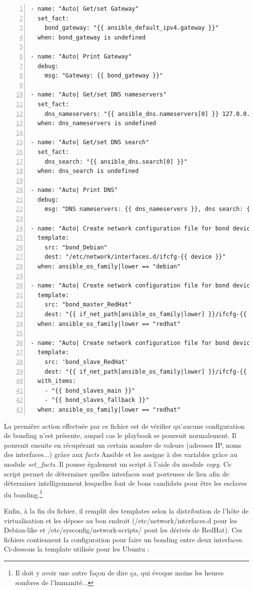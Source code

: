 \documentclass[14 pt,a4paper]{extreport}
\begin{document}
\begin{framed}
\begin{Verbatim}[fontsize=\tiny,numbers=left]
- name: "Auto| Get/set Gateway"
  set_fact:
    bond_gateway: "{{ ansible_default_ipv4.gateway }}"
  when: bond_gateway is undefined

- name: "Auto| Print Gateway"
  debug:
    msg: "Gateway: {{ bond_gateway }}"

- name: "Auto| Get/set DNS nameservers"
  set_fact:
    dns_nameservers: "{{ ansible_dns.nameservers[0] }} 127.0.0.1"
  when: dns_nameservers is undefined

- name: "Auto| Get/set DNS search"
  set_fact:
    dns_search: "{{ ansible_dns.search[0] }}"
  when: dns_search is undefined

- name: "Auto| Print DNS"
  debug:
    msg: "DNS nameservers: {{ dns_nameservers }}, dns search: {{ dns_search }}"

- name: "Auto| Create network configuration file for bond devices"
  template:
    src: "bond_Debian"
    dest: "/etc/network/interfaces.d/ifcfg-{{ device }}"
  when: ansible_os_family|lower == "debian"

- name: "Auto| Create network configuration file for bond device master, slave)"
  template:
    src: "bond_master_RedHat"
    dest: "{{ if_net_path[ansible_os_family|lower] }}/ifcfg-{{ device }}"
  when: ansible_os_family|lower == "redhat"

- name: "Auto| Create network configuration file for bond devices (slaves)"
  template:
    src: 'bond_slave_RedHat'
    dest: "{{ if_net_path[ansible_os_family|lower] }}/ifcfg-{{ item }}"
  with_items:
    - "{{ bond_slaves_main }}"
    - "{{ bond_slaves_fallback }}"
  when: ansible_os_family|lower == "redhat"
\end{Verbatim}
\end{framed}

La première action effectuée par ce fichier est de vérifier qu'aucune configuration de bonding n'est présente, auquel cas le playbook se poursuit normalement. Il poursuit ensuite en récupérant un certain nombre de valeurs (adresses IP, noms des interfaces...) grâce aux \emph{facts }Ansible et les assigne à des variables grâce au module \emph{set\_facts}. Il pousse également un script à l'aide du module \emph{copy}. Ce script permet de déterminer quelles interfaces sont porteuses de lien afin de déterminer intelligemment lesquelles font de bons candidats pour être les esclaves du bonding.\footnote{Il doit y avoir une autre façon de dire ça, qui évoque moins les heures sombres de l'humanité...}

Enfin, à la fin du fichier, il remplit des templates selon la distribution de l'hôte de virtualisation et les dépose au bon endroit (/etc/network/interfaces.d pour les Debian-like et /etc/sysconfig/network-scripts/ pout les dérivés de RedHat). Ces fichiers contiennent la configuration pour faire un bonding entre deux interfaces. Ci-dessous la template utilisée pour les Ubuntu :
\end{document}
